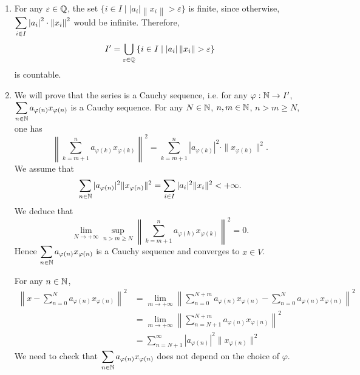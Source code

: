 \begin{proofenv}
    \quad 
    \begin{enumerate}
        \item For any $\varepsilon \in \mathbb{Q}$, the set $\{i\in I \mid \left|a_i\right|\left\|x_i\right\| > \varepsilon\}$ is finite, since otherwise, $\displaystyle \sum_{i\in I} \left|a_i\right|^2 \cdot \left\|x_i\right\|^2$ would be infinite.
        Therefore, 
        $$ I' = \bigcup_{\varepsilon \in \mathbb{Q}} \left\{i\in I \mid \left|a_i\right|\left\|x_i\right\| > \varepsilon\right\}$$
        is countable.
        \item We will prove that the series is a Cauchy sequence, i.e. for any $\varphi : \mathbb{N} \rightarrow I'$, $\displaystyle \sum_{n\in\mathbb{N}} a_{\varphi(n)} x_{\varphi(n)}$ is a Cauchy sequence.
        For any $N\in \mathbb{N}$, $n,m\in \mathbb{N}$, $n>m\ge N$, one has 
        $$ \left\| \sum_{k = m + 1}^{n} a_{\varphi(k)} x_{\varphi(k)}\right\|^2 = \sum_{k = m + 1}^{n} |a_{\varphi(k)}|^2 \cdot \|x_{\varphi(k)}\|^2.$$
        We assume that
        $$ \sum_{n\in \mathbb{N}} |a_{\varphi(n)}|^2 \|x_{\varphi(n)}\|^2 = \sum_{i \in I} |a_i|^2 \|x_i\|^2 < +\infty.$$
        We deduce that 
        $$ \lim_{N\rightarrow +\infty} \sup_{n>m\ge N} \left\| \sum_{k = m + 1}^{n} a_{\varphi(k)} x_{\varphi(k)}\right\|^2 = 0.$$
        Hence $\displaystyle  \sum_{n\in \mathbb{N}} a_{\varphi(n)} x_{\varphi(n)}$ is a Cauchy sequence and converges to $x \in V$.
        
        \quad For any $n\in \mathbb{N}$, 
        $$ \begin{aligned}
            \left\| x - \sum_{n = 0}^{N} a_{\varphi(n)} x_{\varphi(n)}\right\|^2 &= \lim_{m\rightarrow +\infty} \left\| \sum_{n = 0}^{N + m} a_{\varphi(n)} x_{\varphi(n)} - \sum_{n = 0}^{N} a_{\varphi(n)} x_{\varphi(n)}\right\|^2\\
            & = \lim_{m\rightarrow +\infty} \left\| \sum_{n = N + 1}^{N + m} a_{\varphi(n)} x_{\varphi(n)}\right\|^2\\
            & = \sum_{n = N + 1}^{\infty} |a_{\varphi(n)}|^2 \|x_{\varphi(n)}\|^2
        \end{aligned}$$
        We need to check that $\displaystyle \sum_{ n\in \mathbb{N}} a_{\varphi(n)} x_{\varphi(n)}$ does not depend on the choice of $\varphi$.


\end{enumerate}
\end{proofenv}
